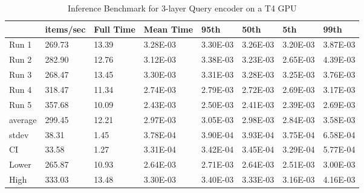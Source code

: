 \begin{table*}[!ht]
    \centering
    \begin{tabular}{|l|l|l|l|l|l|l|l|}
    \hline
        ~ & items/sec & Full Time & Mean Time & 95th & 50th & 5th & 99th \\ \hline
        Run 1 & 269.73 & 13.39 & 3.28E-03 & 3.30E-03 & 3.26E-03 & 3.20E-03 & 3.87E-03 \\ \hline
        Run 2 & 282.90 & 12.76 & 3.12E-03 & 3.38E-03 & 3.23E-03 & 2.65E-03 & 4.39E-03 \\ \hline
        Run 3 & 268.47 & 13.45 & 3.30E-03 & 3.31E-03 & 3.28E-03 & 3.25E-03 & 3.76E-03 \\ \hline
        Run 4 & 318.47 & 11.34 & 2.74E-03 & 2.79E-03 & 2.72E-03 & 2.69E-03 & 3.17E-03 \\ \hline
        Run 5 & 357.68 & 10.09 & 2.43E-03 & 2.50E-03 & 2.41E-03 & 2.39E-03 & 2.69E-03 \\ \hline
        average & 299.45 & 12.21 & 2.97E-03 & 3.05E-03 & 2.98E-03 & 2.84E-03 & 3.58E-03 \\ \hline
        stdev & 38.31 & 1.45 & 3.78E-04 & 3.90E-04 & 3.93E-04 & 3.75E-04 & 6.58E-04 \\ \hline
        CI & 33.58 & 1.27 & 3.31E-04 & 3.42E-04 & 3.45E-04 & 3.29E-04 & 5.77E-04 \\ \hline
        Lower & 265.87 & 10.93 & 2.64E-03 & 2.71E-03 & 2.64E-03 & 2.51E-03 & 3.00E-03 \\ \hline
        High & 333.03 & 13.48 & 3.30E-03 & 3.40E-03 & 3.33E-03 & 3.16E-03 & 4.16E-03 \\ \hline
    \end{tabular}
    \caption{Inference Benchmark for 3-layer Query encoder on a T4 GPU}
    \label{tab:benchmark-gpu-3layer}
\end{table*}

